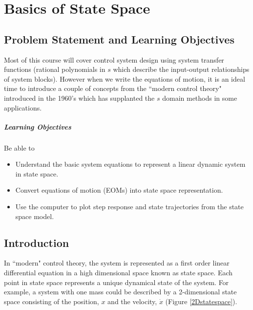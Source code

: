  

\chapter{Basics of State Space}\label{BasicsStateSpaceChapter}
 

\section{Problem Statement and Learning Objectives}
 
Most of this course will cover control system design using system transfer functions (rational polynomials in $s$ which describe the input-output relationships of system blocks).  However when we write the equations of motion, it is an ideal time to introduce a couple of concepts from the ``modern control theory" introduced in the 1960's which has supplanted the $s$ domain methods in some applications.  

\paragraph{Learning Objectives}
Be able to
\begin{itemize}
    \item Understand the basic system equations to represent a linear
    dynamic system in state space. 
    \item Convert equations of motion (EOMs) into state space
    representation.
    \item Use the computer to plot step response and state trajectories from
    the state space model. 
\end{itemize}

\section{Introduction}
In ``modern" control theory, the system is represented as a first order linear differential equation in a high dimensional space known as state space.  Each point in state space represents a unique dynamical state of the system.   For example, a system with one mass could be described by a 2-dimensional state space consisting of the position, $x$ and the velocity, $\dot{x}$ (Figure \ref{2Dstatespace}).

